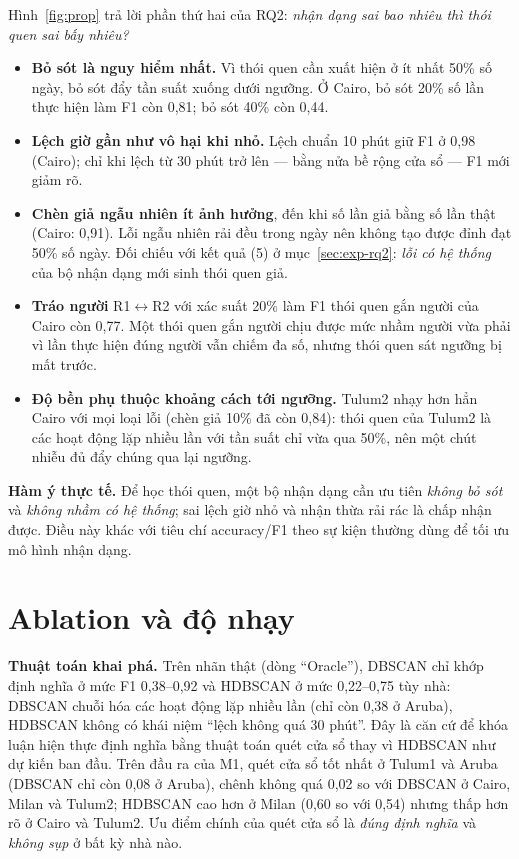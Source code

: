 Hình~\ref{fig:prop} trả lời phần thứ hai của RQ2: \emph{nhận dạng sai bao nhiêu thì thói quen sai bấy
nhiêu?}

\begin{itemize}
  \item \textbf{Bỏ sót là nguy hiểm nhất.} Vì thói quen cần xuất hiện ở ít nhất 50\% số ngày, bỏ sót đẩy
  tần suất xuống dưới ngưỡng. Ở Cairo, bỏ sót 20\% số lần thực hiện làm F1 còn 0,81; bỏ sót 40\% còn 0,44.
  \item \textbf{Lệch giờ gần như vô hại khi nhỏ.} Lệch chuẩn 10 phút giữ F1 ở 0,98 (Cairo); chỉ khi lệch
  từ 30 phút trở lên --- bằng nửa bề rộng cửa sổ --- F1 mới giảm rõ.
  \item \textbf{Chèn giả ngẫu nhiên ít ảnh hưởng}, đến khi số lần giả bằng số lần thật (Cairo: 0,91). Lỗi
  ngẫu nhiên rải đều trong ngày nên không tạo được đỉnh đạt 50\% số ngày. Đối chiếu với kết quả (5) ở
  mục~\ref{sec:exp-rq2}: \emph{lỗi có hệ thống} của bộ nhận dạng mới sinh thói quen giả.
  \item \textbf{Tráo người} R1$\leftrightarrow$R2 với xác suất 20\% làm F1 thói quen gắn người của Cairo
  còn 0,77. Một thói quen gắn người chịu được mức nhầm người vừa phải vì lần thực hiện đúng người vẫn
  chiếm đa số, nhưng thói quen sát ngưỡng bị mất trước.
  \item \textbf{Độ bền phụ thuộc khoảng cách tới ngưỡng.} Tulum2 nhạy hơn hẳn Cairo với mọi loại lỗi
  (chèn giả 10\% đã còn 0,84): thói quen của Tulum2 là các hoạt động lặp nhiều lần với tần suất chỉ vừa
  qua 50\%, nên một chút nhiễu đủ đẩy chúng qua lại ngưỡng.
\end{itemize}

\textbf{Hàm ý thực tế.} Để học thói quen, một bộ nhận dạng cần ưu tiên \emph{không bỏ sót} và \emph{không
nhầm có hệ thống}; sai lệch giờ nhỏ và nhận thừa rải rác là chấp nhận được. Điều này khác với tiêu chí
accuracy/F1 theo sự kiện thường dùng để tối ưu mô hình nhận dạng.

\section{Ablation và độ nhạy}
\label{sec:exp-ablation}



\textbf{Thuật toán khai phá.} Trên nhãn thật (dòng ``Oracle''), DBSCAN chỉ khớp định nghĩa ở mức F1
0,38--0,92 và HDBSCAN ở mức 0,22--0,75 tùy nhà: DBSCAN chuỗi hóa các hoạt động lặp nhiều lần (chỉ còn 0,38
ở Aruba), HDBSCAN không có khái niệm ``lệch không quá 30 phút''. Đây là căn cứ để khóa luận hiện thực định
nghĩa bằng thuật toán quét cửa sổ thay vì HDBSCAN như dự kiến ban đầu. Trên đầu ra của M1, quét cửa sổ tốt
nhất ở Tulum1 và Aruba (DBSCAN chỉ còn 0,08 ở Aruba), chênh không quá 0,02 so với DBSCAN ở Cairo, Milan và
Tulum2; HDBSCAN cao hơn ở Milan (0,60 so với 0,54) nhưng thấp hơn rõ ở Cairo và Tulum2. Ưu điểm chính của
quét cửa sổ là \emph{đúng định nghĩa} và \emph{không sụp} ở bất kỳ nhà nào.

